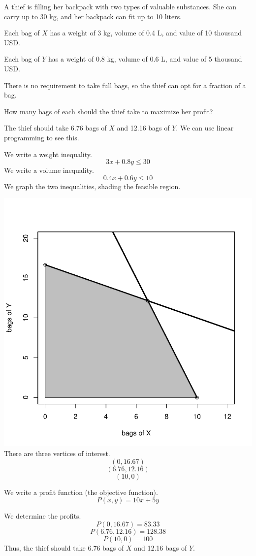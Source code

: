 
\begin{question}
A thief is filling her backpack with two types of valuable substances.
She can carry up to 30 kg, and her backpack can fit up to 10 liters.

Each bag of \(X\) has a weight of 3 kg, volume of 0.4 L, and value of 10
thousand USD.

Each bag of \(Y\) has a weight of 0.8 kg, volume of 0.6 L, and value of
5 thousand USD.

There is no requirement to take full bags, so the thief can opt for a
fraction of a bag.

How many bags of each should the thief take to maximize her profit?
\end{question}

\begin{solution}
The thief should take 6.76 bags of \(X\) and 12.16 bags of \(Y\). We can
use linear programming to see this.

We write a weight inequality. \[3x+0.8y \le 30\] We write a volume
inequality. \[0.4x+0.6y \le 10\] We graph the two inequalities, shading
the feasible region.

\includegraphics{unnamed-chunk-1-1.pdf}\\

There are three vertices of interest. \[(0,16.67) \] \[(6.76,12.16) \]
\[(10,0)\]

We write a profit function (the objective function).
\[P(x,y) = 10x+5y \]

We determine the profits. \[P(0,16.67)=83.33 \]
\[P(6.76,12.16)=128.38 \] \[P(10,0)=100 \] Thus, the thief should take
6.76 bags of \(X\) and 12.16 bags of \(Y\).
\end{solution}

